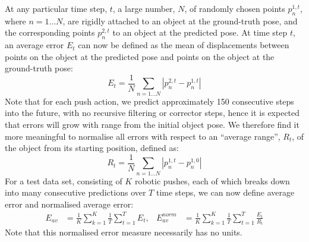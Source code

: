 At any particular time step, $t$, a large number, $N$, of randomly chosen points $p_{n}^{1,t}$, where $n=1 \ldots N$, are rigidly attached to an object at the ground-truth pose, and the corresponding points $p_{n}^{2,t}$ to an object at the predicted pose. At time step $t$, an average error $E_t$ can now be defined as the mean of displacements between points on the object at the predicted pose and points on the object at the ground-truth pose:
\begin{equation}
E_t = \frac{1}{N} \mathop{\sum}_{n=1 \ldots N}|p_{n}^{2,t}-p_{n}^{1,t}|
\label{eq:defn_Rt}
\end{equation}
Note that for each push action, we predict approximately 150
consecutive steps into the future, with no recursive filtering or
corrector steps, hence it is expected that errors will grow with range
from the initial object pose. We therefore find it more meaningful to
normalise all errors with respect to an ``average range'', $R_t$, of
the object from its starting position, defined as:
\begin{equation}
R_t = \frac{1}{N} \mathop{\sum}_{n=1 \ldots N}|p_{n}^{1,t}-p_{n}^{1,0}|
\label{eq:defn_Et}
\end{equation}
For a test data set, consisting of $K$ robotic pushes, each of which breaks down into many consecutive predictions over $T$ time steps, we can now define average error and normalised average error:
\begin{align}
E_{av} &= \frac{1}{K} \mathop{\sum}_{k=1}^{K} \frac{1}{T} \mathop{\sum}_{t=1}^{T} E_t,
&E_{av}^{norm} &= \frac{1}{K} \mathop{\sum}_{k=1}^{K} \frac{1}{T} \mathop{\sum}_{t=1}^{T} \frac{E_t}{R_t}
\label{eq:Error1}
\end{align}
\noindent Note that this normalised error measure necessarily has no
units.



